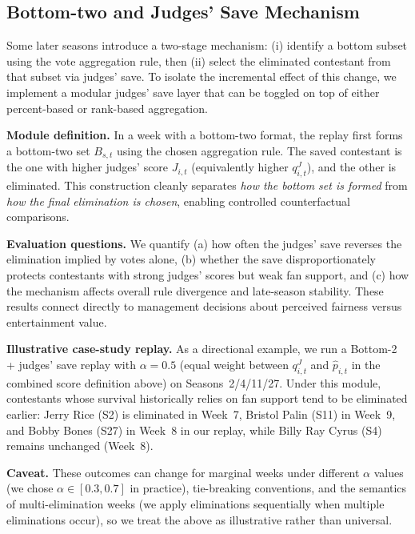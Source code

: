 \subsection{Bottom-two and Judges' Save Mechanism}\label{subsec:bottom_two_and_judges_save}

Some later seasons introduce a two-stage mechanism: (i) identify a bottom subset using the vote aggregation rule, then (ii) select the eliminated contestant from that subset via judges' save.
To isolate the incremental effect of this change, we implement a modular judges' save layer that can be toggled on top of either percent-based or rank-based aggregation.

\textbf{Module definition.} In a week with a bottom-two format, the replay first forms a bottom-two set $B_{s,t}$ using the chosen aggregation rule.
The saved contestant is the one with higher judges' score $J_{i,t}$ (equivalently higher $q^J_{i,t}$), and the other is eliminated.
This construction cleanly separates \emph{how the bottom set is formed} from \emph{how the final elimination is chosen}, enabling controlled counterfactual comparisons.

\textbf{Evaluation questions.} We quantify (a) how often the judges' save reverses the elimination implied by votes alone, (b) whether the save disproportionately protects contestants with strong judges' scores but weak fan support, and (c) how the mechanism affects overall rule divergence and late-season stability.
These results connect directly to management decisions about perceived fairness versus entertainment value.\cite{brandt2016comsoc,saari2001decisions}

\textbf{Illustrative case-study replay.} As a directional example, we run a Bottom-2 + judges' save replay with $\alpha=0.5$
(equal weight between $q^J_{i,t}$ and $\hat p_{i,t}$ in the combined score definition above) on Seasons~2/4/11/27.
Under this module, contestants whose survival historically relies on fan support tend to be eliminated earlier: Jerry Rice (S2) is eliminated in Week~7,
Bristol Palin (S11) in Week~9, and Bobby Bones (S27) in Week~8 in our replay, while Billy Ray Cyrus (S4) remains unchanged (Week~8).

\textbf{Caveat.} These outcomes can change for marginal weeks under different $\alpha$ values (we chose $\alpha \in [0.3, 0.7]$ in practice), tie-breaking conventions, and the semantics of
multi-elimination weeks (we apply eliminations sequentially when multiple eliminations occur), so we treat the above as illustrative rather than universal.




